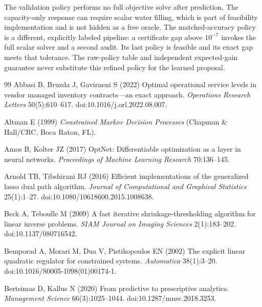 \documentclass[11pt,letterpaper]{article}
\theoremstyle{definition}
\newcommand{\1}{\mathbf 1}
\begin{document}
The validation policy performs no full objective solve after prediction. The capacity-only response can require scalar water filling, which is part of feasibility implementation and is not hidden as a free oracle. The matched-accuracy policy is a different, explicitly labeled pipeline: a certificate gap above $10^{-7}$ invokes the full scalar solver and a second audit. Its last policy is feasible and its exact gap meets that tolerance. The raw-policy table and independent expected-gain guarantee never substitute this refined policy for the learned proposal.


\clearpage
\begin{thebibliography}{99}
Abbasi B, Bruzda J, Gavirneni S (2022) Optimal operational service levels in vendor managed inventory contracts---an exact approach. \emph{Operations Research Letters} 50(5):610--617. doi:10.1016/j.orl.2022.08.007.

Altman E (1999) \emph{Constrained Markov Decision Processes} (Chapman \& Hall/CRC, Boca Raton, FL).

Amos B, Kolter JZ (2017) OptNet: Differentiable optimization as a layer in neural networks. \emph{Proceedings of Machine Learning Research} 70:136--145.

Arnold TB, Tibshirani RJ (2016) Efficient implementations of the generalized lasso dual path algorithm. \emph{Journal of Computational and Graphical Statistics} 25(1):1--27. doi:10.1080/10618600.2015.1008638.

Beck A, Teboulle M (2009) A fast iterative shrinkage-thresholding algorithm for linear inverse problems. \emph{SIAM Journal on Imaging Sciences} 2(1):183--202. doi:10.1137/080716542.

Bemporad A, Morari M, Dua V, Pistikopoulos EN (2002) The explicit linear quadratic regulator for constrained systems. \emph{Automatica} 38(1):3--20. doi:10.1016/S0005-1098(01)00174-1.

Bertsimas D, Kallus N (2020) From predictive to prescriptive analytics. \emph{Management Science} 66(3):1025--1044. doi:10.1287/mnsc.2018.3253.


\end{thebibliography}
\end{document}
